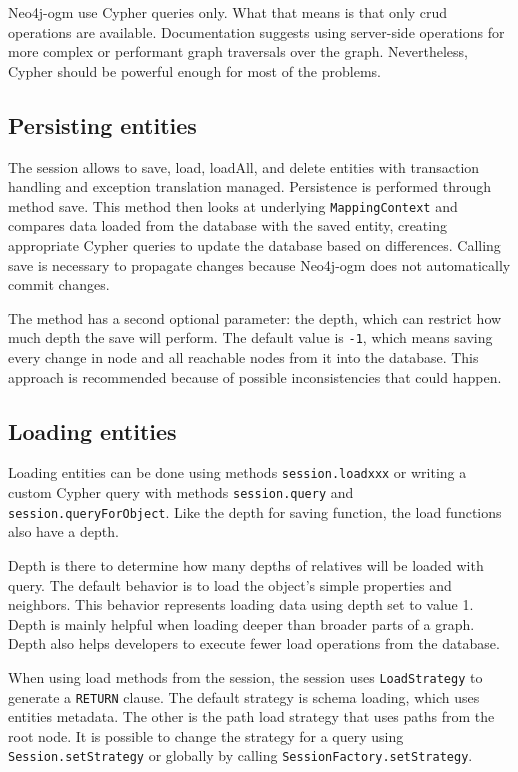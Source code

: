 Neo4j-\acrshort{ogm} use Cypher queries only. What that means is that only \acrfull{crud} operations are available. Documentation
suggests using server-side operations for more complex or performant graph traversals over the graph.
Nevertheless, Cypher should be powerful enough for most of the problems.

\subsection {Persisting entities}

The session allows to save, load, loadAll, and delete entities with transaction handling and exception translation managed.
Persistence is performed through method save. This method then looks at underlying \texttt{MappingContext} and compares data loaded
from the database with the saved entity, creating appropriate Cypher queries to update the database based on differences.
Calling save is necessary to propagate changes because Neo4j-\acrshort{ogm} does not automatically commit changes.

The method has a second optional parameter: the depth, which can restrict how much depth the save will perform.
The default value is \texttt{-1}, which means saving every change in node and all reachable nodes from it into the database.
This approach is recommended because of possible inconsistencies that could happen.

\subsection {Loading entities}

Loading entities can be done using methods \texttt{session.loadxxx} or writing a custom Cypher query with methods \texttt{session.query} and \texttt{session.queryForObject}.
Like the depth for saving function, the load functions also have a depth.

Depth is there to determine how many depths of relatives will be loaded with query. The default behavior is to load the object's simple properties and neighbors.
This behavior represents loading data using depth set to value 1. Depth is mainly helpful when loading deeper than broader parts of a graph. Depth also helps developers to
execute fewer load operations from the database.

When using load methods from the session, the session uses \texttt{LoadStrategy} to generate a \texttt{RETURN} clause. The default strategy is schema loading,
which uses entities metadata. The other is the path load strategy that uses paths from the root node. It is possible to change the strategy for a query using \texttt{Session.setStrategy}
or globally by calling \texttt{SessionFactory.setStrategy}.

